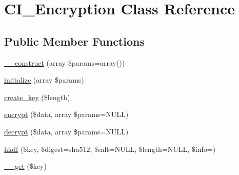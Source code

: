 \hypertarget{class_c_i___encryption}{}\section{C\+I\+\_\+\+Encryption Class Reference}
\label{class_c_i___encryption}
\subsection*{Public Member Functions}
\begin{DoxyCompactItemize}
\item 
\mbox{\hyperlink{class_c_i___encryption_a85ac5b7f54ad67ec6b5b9dc282717602}{\+\_\+\+\_\+construct}} (array \$params=array())
\item 
\mbox{\hyperlink{class_c_i___encryption_ada6f73e99259423863fe312baa4dad10}{initialize}} (array \$params)
\item 
\mbox{\hyperlink{class_c_i___encryption_a153c5db947db0e572680ed82519cf27e}{create\+\_\+key}} (\$length)
\item 
\mbox{\hyperlink{class_c_i___encryption_a4b260dc7f6a9470e3e95ceeceadb2c86}{encrypt}} (\$data, array \$params=N\+U\+LL)
\item 
\mbox{\hyperlink{class_c_i___encryption_a5f379806ec38a79a6be1dc350b07699a}{decrypt}} (\$data, array \$params=N\+U\+LL)
\item 
\mbox{\hyperlink{class_c_i___encryption_a83e2ca4fadcb78629f036ac23b7a5fd9}{hkdf}} (\$key, \$digest=\textquotesingle{}sha512\textquotesingle{}, \$salt=N\+U\+LL, \$length=N\+U\+LL, \$info=\textquotesingle{}\textquotesingle{})
\item 
\mbox{\hyperlink{class_c_i___encryption_a4537dad3b44254124991341cc91b28fb}{\+\_\+\+\_\+get}} (\$key)
\end{DoxyCompactItemize}
